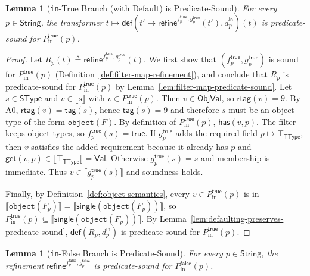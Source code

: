 \documentclass[11pt]{article}
\newtheorem{lemma}[theorem]{Lemma}
\newcommand{\sem}[1]{\llbracket #1 \rrbracket}
\newcommand{\refineop}{\mathsf{refine}}
\newcommand{\ObjVal}{\mathsf{ObjVal}}
\newcommand{\String}{\mathsf{String}}
\newcommand{\SType}{\mathsf{SType}}
\newcommand{\TType}{\mathsf{TType}}
\newcommand{\tagfn}{\mathsf{tag}}
\newcommand{\rtag}{\mathsf{rtag}}
\newcommand{\Val}{\mathsf{Val}}
\begin{document}
\begin{lemma}[\texttt{in}-True Branch (with Default) is Predicate-Sound]
\label{lem:in-true-predicate-sound}
For every $p \in \String$, the transformer $t \mapsto \mathsf{def}(t' \mapsto \refineop^{f^{\mathsf{true}}_p,g^{\mathsf{true}}_p}(t'), d^{\mathsf{in}}_p)(t)$
is predicate-sound for $P_{\mathrm{in}}^{\mathsf{true}}(p)$.
\end{lemma}

\begin{proof}
Let $R_p(t)\triangleq \refineop^{f^{\mathsf{true}}_p,g^{\mathsf{true}}_p}(t)$.
We first show that $(f^{\mathsf{true}}_p,g^{\mathsf{true}}_p)$ is sound for $P_{\mathrm{in}}^{\mathsf{true}}(p)$ (Definition~\ref{def:filter-map-refinement}), and conclude that $R_p$ is predicate-sound for $P_{\mathrm{in}}^{\mathsf{true}}(p)$ by Lemma~\ref{lem:filter-map-predicate-sound}.
Let $s \in \SType$ and $v \in \sem{s}$ with $v \in P_{\mathrm{in}}^{\mathsf{true}}(p)$.
Then $v \in \ObjVal$, so $\rtag(v)=9$.
By A0, $\rtag(v)=\tagfn(s)$, hence $\tagfn(s)=9$ and therefore $s$ must be an object type of the form $\texttt{object}(F)$.
By definition of $P_{\mathrm{in}}^{\mathsf{true}}(p)$, $\mathsf{has}(v,p)$.
The filter keeps object types, so $f^{\mathsf{true}}_p(s)=\mathsf{true}$.
If $g^{\mathsf{true}}_p$ adds the required field $p \mapsto \top_{\TType}$, then $v$ satisfies the added requirement because it already has $p$ and $\mathsf{get}(v,p) \in \sem{\top_{\TType}}=\Val$.
Otherwise $g^{\mathsf{true}}_p(s)=s$ and membership is immediate.
Thus $v \in \sem{g^{\mathsf{true}}_p(s)}$ and soundness holds.

Finally, by Definition~\ref{def:object-semantics}, every $v \in P_{\mathrm{in}}^{\mathsf{true}}(p)$ is in $\sem{\texttt{object}(F_p)}=\sem{\mathsf{single}(\texttt{object}(F_p))}$, so
$P_{\mathrm{in}}^{\mathsf{true}}(p) \subseteq \sem{\mathsf{single}(\texttt{object}(F_p))}$.
By Lemma~\ref{lem:defaulting-preserves-predicate-sound}, $\mathsf{def}(R_p,d^{\mathsf{in}}_p)$ is predicate-sound for $P_{\mathrm{in}}^{\mathsf{true}}(p)$.
\end{proof}

\begin{lemma}[\texttt{in}-False Branch is Predicate-Sound]
\label{lem:in-false-predicate-sound}
For every $p \in \String$, the refinement $\refineop^{f^{\mathsf{false}}_p,g^{\mathsf{false}}_p}$ is predicate-sound for $P_{\mathrm{in}}^{\mathsf{false}}(p)$.
\end{lemma}
\end{document}
